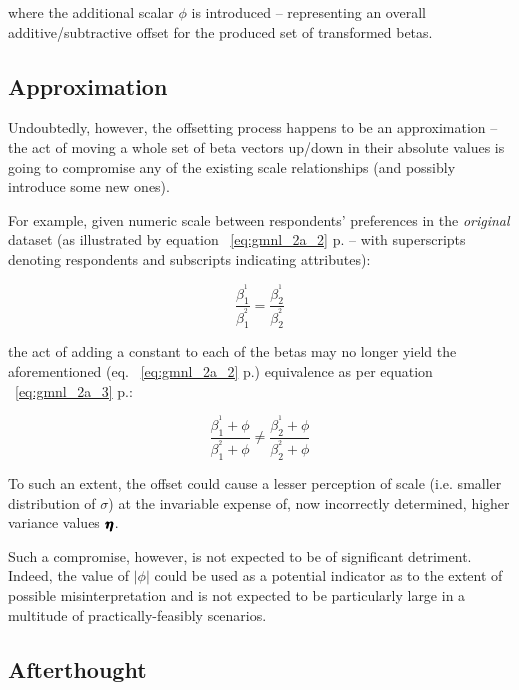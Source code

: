\documentclass[12pt,a4paper]{article}
\begin{document}
where the additional scalar \(\phi\) is introduced -- representing an overall additive/subtractive offset for the produced set of transformed betas. 

\subsection{Approximation}

Undoubtedly, however, the offsetting process happens to be an approximation -- the act of moving a whole set of beta vectors up/down in their absolute values is going to compromise any of the existing scale relationships (and possibly introduce some new ones).

For example, given numeric scale between respondents' preferences in the \textit{original} dataset (as illustrated by equation ~\ref{eq:gmnl_2a_2} p.\pageref{eq:gmnl_2a_2} -- with superscripts denoting respondents and subscripts indicating attributes):

{ \Large 
\begin{equation}
\label{eq:gmnl_2a_2}
\frac{\beta^{^1}_{1}}{\beta^{^2}_{1}}=\frac{\beta^{^1}_{2}}{\beta^{^2}_{2}}
\end{equation}
}

the act of adding a constant to each of the betas may no longer yield the aforementioned (eq. ~\ref{eq:gmnl_2a_2} p.\pageref{eq:gmnl_2a_2}) equivalence as per equation ~\ref{eq:gmnl_2a_3} p.\pageref{eq:gmnl_2a_3}:

{ \Large 
\begin{equation}
\label{eq:gmnl_2a_3}
\frac{\beta^{^1}_{1} + \phi}{\beta^{^2}_{1} + \phi} \neq \frac{\beta^{^1}_{2} + \phi}{\beta^{^2}_{2} + \phi}
\end{equation}
}

To such an extent, the offset could cause a lesser perception of scale (i.e. smaller distribution of \(\sigma\)) at the invariable expense of, now incorrectly determined, higher variance values \(\pmb{\hm{\eta}}\).

Such a compromise, however, is not expected to be of significant detriment. Indeed, the value of \(\vert \phi \vert\) could be used as a potential indicator as to the extent of possible misinterpretation and is not expected to be particularly large in a multitude of practically-feasibly scenarios.

\subsection{Afterthought}
\end{document}

